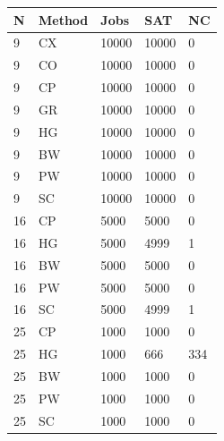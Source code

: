 \begin{tabular}{lllll}
\hline
N & Method & Jobs & SAT & NC \\
\hline
9 & CX & 10000 & 10000 & 0 \\
9 & CO & 10000 & 10000 & 0 \\
9 & CP & 10000 & 10000 & 0 \\
9 & GR & 10000 & 10000 & 0 \\
9 & HG & 10000 & 10000 & 0 \\
9 & BW & 10000 & 10000 & 0 \\
9 & PW & 10000 & 10000 & 0 \\
9 & SC & 10000 & 10000 & 0 \\
16 & CP & 5000 & 5000 & 0 \\
16 & HG & 5000 & 4999 & 1 \\
16 & BW & 5000 & 5000 & 0 \\
16 & PW & 5000 & 5000 & 0 \\
16 & SC & 5000 & 4999 & 1 \\
25 & CP & 1000 & 1000 & 0 \\
25 & HG & 1000 & 666 & 334 \\
25 & BW & 1000 & 1000 & 0 \\
25 & PW & 1000 & 1000 & 0 \\
25 & SC & 1000 & 1000 & 0 \\
\hline
\end{tabular}

